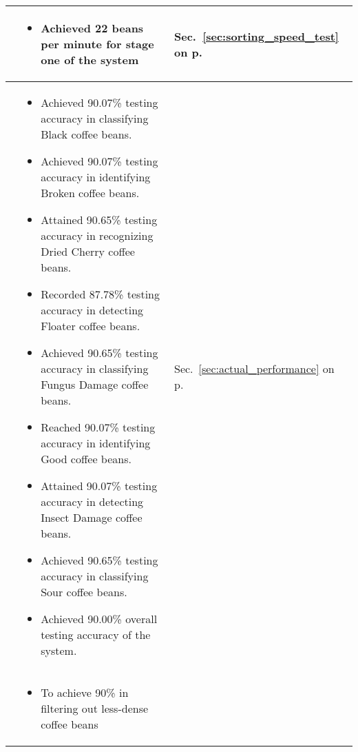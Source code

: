 \begin{center}
{\begin{tabularx}{\textwidth}{p{}|p{}|p{}}
			
			\Paste{SO2} & 

			\begin{itemize}
				\item Achieved 22 beans per minute for stage one of the system
			\end{itemize} 
	
			& Sec.~\ref{sec:sorting_speed_test} on p.~\pageref{sec:sorting_speed_test}
			\\ \hline
			
			\Paste{SO3} & 
			\begin{itemize}
				\item Achieved 90.07\% testing accuracy in classifying Black coffee beans.
				\item Achieved 90.07\% testing accuracy in identifying Broken coffee beans.
				\item Attained 90.65\% testing accuracy in recognizing Dried Cherry coffee beans.
				\item Recorded 87.78\% testing accuracy in detecting Floater coffee beans.
				\item Achieved 90.65\% testing accuracy in classifying Fungus Damage coffee beans.
				\item Reached  90.07\% testing accuracy in identifying Good coffee beans.
				\item Attained 90.07\% testing accuracy in detecting Insect Damage coffee beans.
				\item Achieved 90.65\% testing accuracy in classifying Sour coffee beans.
				\item Achieved 90.00\% overall testing accuracy of the system.
			\end{itemize} 
			& Sec.~\ref{sec:actual_performance} on p.~\pageref{sec:actual_performance}\\ \hline
			
			
			\Paste{SO4} &
			\begin{itemize}
				\item To achieve 90\% in filtering out less-dense coffee beans
			\end{itemize}
			& 			\\ \hline
			
		\end{tabularx}
	}
\end{center}

